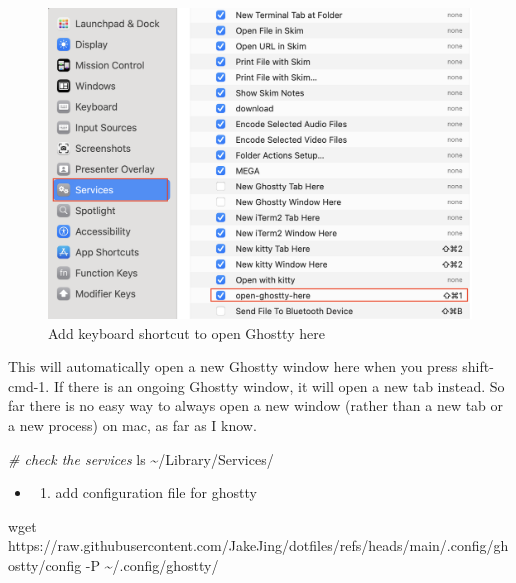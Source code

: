 \documentclass[
  letterpaper,
  DIV=11,
  numbers=noendperiod]{scrartcl}
\newenvironment{Shaded}{}{}
\newcommand{\AttributeTok}[1]{\textcolor[rgb]{0.65,0.15,0.64}{#1}}
\newcommand{\CommentTok}[1]{\textcolor[rgb]{0.63,0.63,0.65}{\textit{#1}}}
\newcommand{\FunctionTok}[1]{\textcolor[rgb]{0.25,0.47,0.95}{#1}}
\newcommand{\NormalTok}[1]{\textcolor[rgb]{0.22,0.23,0.26}{#1}}
\providecommand{\tightlist}{%
  \setlength{\itemsep}{0pt}\setlength{\parskip}{0pt}}\usepackage{longtable,booktabs,array}
\begin{document}
\begin{figure}[H]

{\centering \includegraphics{./images/ghostty-window-here.png}

}

\caption{Add keyboard shortcut to open Ghostty here}

\end{figure}%

This will automatically open a new Ghostty window here when you press
shift-cmd-1. If there is an ongoing Ghostty window, it will open a new
tab instead. So far there is no easy way to always open a new window
(rather than a new tab or a new process) on mac, as far as I know.

\begin{Shaded}
\begin{Highlighting}[]
\CommentTok{\# check the services}
\FunctionTok{ls}\NormalTok{ \textasciitilde{}/Library/Services/}
\end{Highlighting}
\end{Shaded}

\begin{itemize}
\tightlist
\item
  \begin{enumerate}
  \def\labelenumi{(\arabic{enumi})}
  \setcounter{enumi}{3}
  \tightlist
  \item
    add configuration file for ghostty
  \end{enumerate}
\end{itemize}

\begin{Shaded}
\begin{Highlighting}[]
\FunctionTok{wget}\NormalTok{ https://raw.githubusercontent.com/JakeJing/dotfiles/refs/heads/main/.config/ghostty/config }\AttributeTok{{-}P}\NormalTok{ \textasciitilde{}/.config/ghostty/}
\end{Highlighting}
\end{Shaded}
\end{document}
